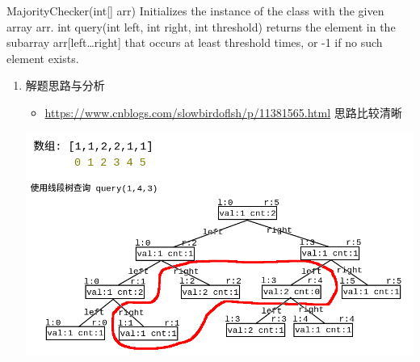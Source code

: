\documentclass[9pt, b5paaper]{book}
\begin{document}
MajorityChecker(int[] arr) Initializes the instance of the class with the given array arr.
int query(int left, int right, int threshold) returns the element in the subarray arr[left\ldots{}right] that occurs at least threshold times, or -1 if no such element exists.
\begin{enumerate}
\item 解题思路与分析
\label{sec-1-0-1-1}
\begin{itemize}
\item \url{https://www.cnblogs.com/slowbirdoflsh/p/11381565.html} 思路比较清晰
\end{itemize}

\includegraphics[width=.9\linewidth]{./pic/1157.png}


\end{enumerate}
\end{document}

